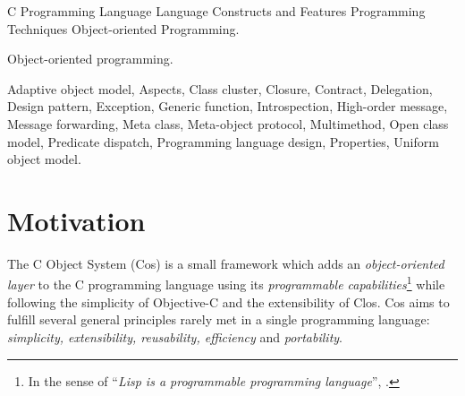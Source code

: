 \documentclass[preprint,10pt]{sigplanconf}
\newcommand{\ProgLang}[1]{{\sc #1}\xspace}
\newcommand{\Clos}      {\ProgLang{Clos}}
\newcommand{\Cos}       {\ProgLang{Cos}}
\newcommand{\Objc}      {\ProgLang{Objective-C}}
\begin{document}
\begin{abstract} 
The C Object System (\Cos) is a small C library which implements high-level concepts available in \Clos, \Objc and other object-oriented programming languages: {\em uniform object model} (class, meta\-class and property-metaclass), {\em generic functions, multi-methods, delegation, properties, exceptions, contracts} and {\em closures}. \Cos relies on the program\-mable capabilities of the C programming language to extend its syntax and to implement the aforementioned concepts as {\em first-class objects}. \Cos aims at satisfying several general principles like {\em simplicity, extensibility, reusability, efficiency} and {\em portability} which are rarely met in a single programming language. Its design is tuned to provide efficient and portable implementation of {\em message multi-dispatch} and {\em message multi-forwarding} which are the heart of code extensibility and reusability. With COS features in hand, software should become as flexible and extensible as with scripting languages and as efficient and portable as expected with C programming. Likewise, \Cos concepts should significantly simplify {\em adaptive} and {\em aspect-oriented} programming as well as {\em distributed} and {\em service-oriented} computing.
\end{abstract}
            
{C Programming Language}
{Language Constructs and Features}
{Programming Techniques}
{Object-oriented Programming}.

\terms
Object-oriented programming.


\keywords
Adaptive object model,
Aspects,
Class cluster,
Closure,
Contract,
Delegation,
Design pattern,
Exception,
Generic function,
Introspection,
High-order message,
Message forwarding,
Meta class,
Meta-object protocol,
Multimethod,
Open class model,
Predicate dispatch,
Programming language design,
Properties,
Uniform object model.






\section{Motivation\label{sec:why}}




The C Object System (\Cos) is a small framework which adds an {\em object-oriented layer} to the C programming language \cite{c99, harb02, hans97} using its {\em programmable capabilities}\footnote{In the sense of ``{\em Lisp is a programmable programming language}'', \cite{fod91}.}  while following the simplicity of \Objc \cite{objc91, objc08} and the extensibility of \Clos \cite{clos89,mop91,clos91}. \Cos aims to fulfill several general principles rarely met in a single programming language: {\em simplicity, extensibility, reusability, efficiency} and {\em portability}.
\end{document}
